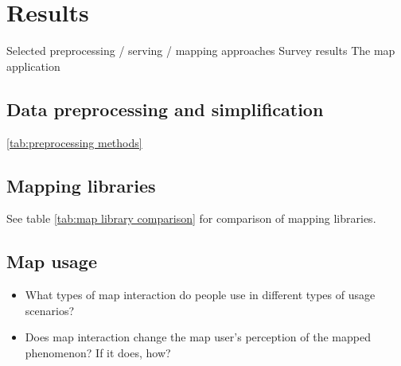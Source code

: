 \section{Results}
Selected preprocessing / serving / mapping approaches
Survey results
The map application

\subsection{Data preprocessing and simplification}

\ref{tab:preprocessing methods}



\subsection{Mapping libraries}


See table \ref{tab:map library comparison} for comparison of mapping libraries.


\subsection{Map usage}

\begin{itemize}
	\item What types of map interaction do people use
	in different types of usage scenarios?
	\item Does map interaction change
	the map user's perception of the mapped phenomenon? If it does, how?
\end{itemize}

